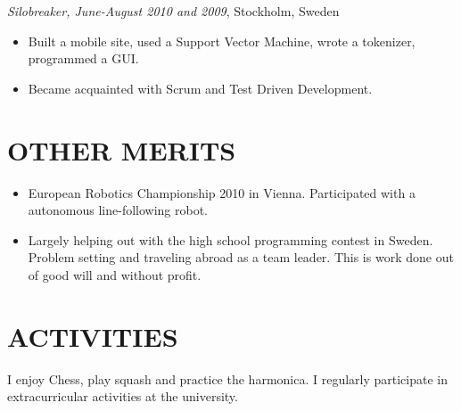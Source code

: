 \documentclass[11pt]{res} %
\begin{document}
\begin{resume}
\emph{Silobreaker, June-August 2010 and 2009}, Stockholm, Sweden
\vspace{0.2in}
 \begin{itemize} %
  \item Built a mobile site, used a Support Vector Machine, wrote a tokenizer,
   programmed a GUI.
  \item Became acquainted with Scrum and Test Driven Development.
\end{itemize}

\section{OTHER MERITS}

   \begin{itemize} %
   \item European Robotics Championship 2010 in Vienna.
    Participated with a autonomous line-following robot.
   \item Largely helping out with the high school programming contest in Sweden.
    Problem setting and traveling abroad as a team leader.
    This is work done out of good will and without profit.
 \end{itemize}

\section{ACTIVITIES}

I enjoy Chess, play squash and practice the harmonica.
I regularly participate in extracurricular
activities at the university.


\end{resume}
\end{document}
